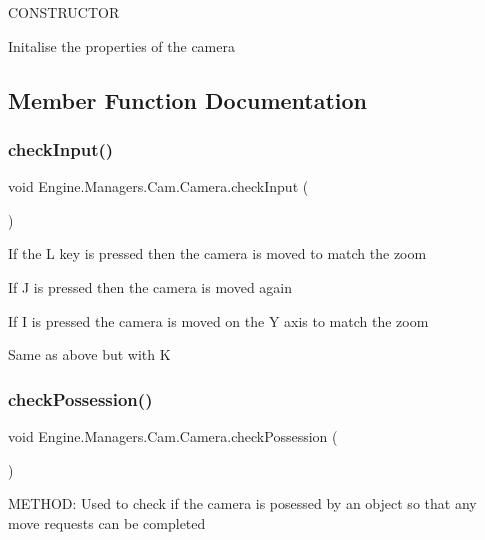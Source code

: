 C\+O\+N\+S\+T\+R\+U\+C\+T\+OR 

Initalise the properties of the camera 

\subsection{Member Function Documentation}
\mbox{\label{a00490_a87b553b3288448c4d6fe055398faa363}} 
\subsubsection{\texorpdfstring{check\+Input()}{checkInput()}}
{\footnotesize\ttfamily void Engine.\+Managers.\+Cam.\+Camera.\+check\+Input (\begin{DoxyParamCaption}{ }\end{DoxyParamCaption})\hspace{0.3cm}{\ttfamily [inline]}}

If the L key is pressed then the camera is moved to match the zoom

If J is pressed then the camera is moved again

If I is pressed the camera is moved on the Y axis to match the zoom

Same as above but with K \mbox{\label{a00490_a77490f1a670ff106e843a46a712c9929}} 
\subsubsection{\texorpdfstring{check\+Possession()}{checkPossession()}}
{\footnotesize\ttfamily void Engine.\+Managers.\+Cam.\+Camera.\+check\+Possession (\begin{DoxyParamCaption}{ }\end{DoxyParamCaption})\hspace{0.3cm}{\ttfamily [inline]}}



M\+E\+T\+H\+OD\+: Used to check if the camera is posessed by an object so that any move requests can be completed 

